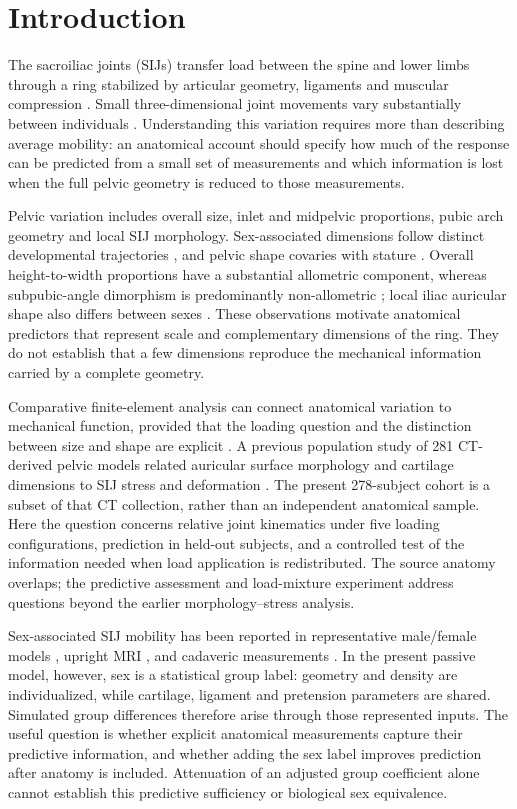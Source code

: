 \section{Introduction}
The sacroiliac joints (SIJs) transfer load between the spine and lower limbs through a ring stabilized by articular geometry, ligaments and muscular compression \citep{Snijders1993,Vleeming2012,Hammer2013}. Small three-dimensional joint movements vary substantially between individuals \citep{Hammer2019}. Understanding this variation requires more than describing average mobility: an anatomical account should specify how much of the response can be predicted from a small set of measurements and which information is lost when the full pelvic geometry is reduced to those measurements.

Pelvic variation includes overall size, inlet and midpelvic proportions, pubic arch geometry and local SIJ morphology. Sex-associated dimensions follow distinct developmental trajectories \citep{Huseynov2016}, and pelvic shape covaries with stature \citep{Fischer2015}. Overall height-to-width proportions have a substantial allometric component, whereas subpubic-angle dimorphism is predominantly non-allometric \citep{Fischer2017}; local iliac auricular shape also differs between sexes \citep{Nishi2020}. These observations motivate anatomical predictors that represent scale and complementary dimensions of the ring. They do not establish that a few dimensions reproduce the mechanical information carried by a complete geometry.

Comparative finite-element analysis can connect anatomical variation to mechanical function, provided that the loading question and the distinction between size and shape are explicit \citep{Dumont2009}. A previous population study of 281 CT-derived pelvic models related auricular surface morphology and cartilage dimensions to SIJ stress and deformation \citep{HenysHammer2025}. The present 278-subject cohort is a subset of that CT collection, rather than an independent anatomical sample. Here the question concerns relative joint kinematics under five loading configurations, prediction in held-out subjects, and a controlled test of the information needed when load application is redistributed. The source anatomy overlaps; the predictive assessment and load-mixture experiment address questions beyond the earlier morphology--stress analysis.

Sex-associated SIJ mobility has been reported in representative male/female models \citep{Joukar2018}, upright MRI \citep{Tani2023}, and cadaveric measurements \citep{Shin2024}. In the present passive model, however, sex is a statistical group label: geometry and density are individualized, while cartilage, ligament and pretension parameters are shared. Simulated group differences therefore arise through those represented inputs. The useful question is whether explicit anatomical measurements capture their predictive information, and whether adding the sex label improves prediction after anatomy is included. Attenuation of an adjusted group coefficient alone cannot establish this predictive sufficiency or biological sex equivalence.

